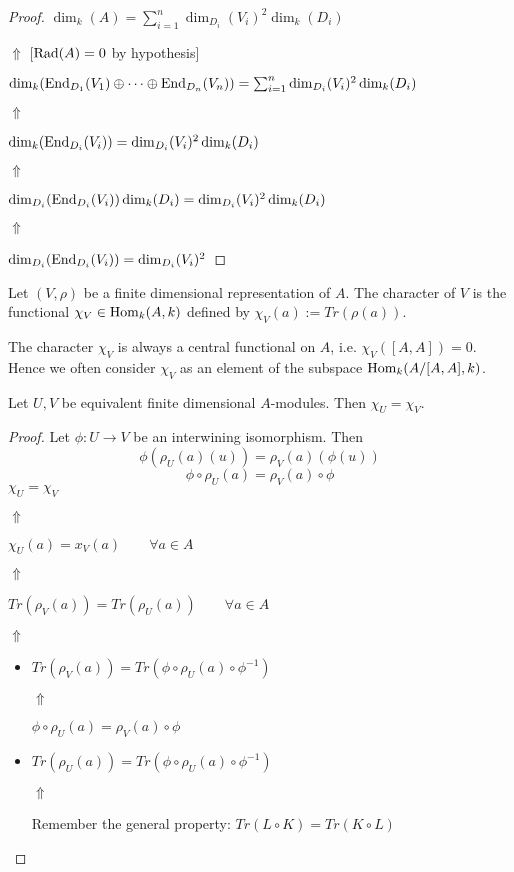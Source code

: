 \begin{proof}
\(\dim_{k}(A)=\sum _{i=1}^n \dim_{D_{i}}(V_{i})^{2} \dim_{k}(D_{i})\)

\(\Uparrow \) [\(\operatorname{Rad}(A)=0\) by hypothesis]

\(\dim_{k}(\operatorname{End}_{D_{1}}(V_{1})\oplus \cdots \oplus \operatorname{End}_{D_{n}}(V_{n}))=\sum _{i=1}^n \dim_{D_{i}}(V_{i})^{2} \dim_{k}(D_{i})\)

\(\Uparrow \)

\(\dim_{k}(\operatorname{End}_{D_{i}}(V_{i}))= \dim_{D_{i}}(V_{i})^{2} \dim_{k}(D_{i})\)

\(\Uparrow \)

\(\dim_{D_{i}}(\operatorname{End}_{D_{i}}(V_{i}))\dim_{k}(D_{i}) =\dim_{D_{i}}(V_{i})^{2} \dim_{k}(D_{i})\)

\(\Uparrow \)

\(\dim_{D_{i}}(\operatorname{End}_{D_{i}}(V_{i})) =\dim_{D_{i}}(V_{i})^{2} \)

\end{proof}

\begin{defn}
Let \((V,\rho )\) be a finite dimensional representation of \(A\). The character of \(V\) is the functional \(\chi _V\in \operatorname{Hom}_{k}(A,k)\) defined by \(\chi _V(a):=Tr(\rho (a)).\)
\end{defn}

\begin{prop}
The character \(\chi _V\) is always a central functional on \(A\), i.e. \(\chi _V([A,A])=0.\) Hence we often consider \(\chi _V\) as an element of the subspace \(\operatorname{Hom}_{k}(A/[A,A],k)\).
\end{prop}

\begin{prop}
Let \(U,V\) be equivalent finite dimensional \(A\)-modules. Then \(\chi _U=\chi _V.\)
\end{prop}
\newpage
\begin{proof}
Let \(\phi :U\rightarrow V\) be an interwining isomorphism. Then
\[
\phi (\rho _U(a)(u))=\rho _V(a)(\phi (u)) 
\] \[
\phi \circ \rho _U(a)=\rho _V(a)\circ \phi 
\]
\(\chi _U=\chi _V\)

\(\Uparrow \)

\(\chi _U(a)=x_V(a) \qquad \forall a\in A\)

\(\Uparrow \)

\(Tr(\rho _V(a))=Tr(\rho _U(a)) \qquad \forall a\in A\)

\(\Uparrow \)

\begin{itemize}
  \item \(Tr(\rho _V(a))=Tr(\phi \circ \rho _U(a)\circ \phi ^{-1})\)

\(\Uparrow \)

\(\phi \circ \rho _U(a)=\rho _V(a)\circ \phi \)
  \item \(Tr(\rho _U(a))=Tr(\phi \circ \rho _U(a)\circ \phi ^{-1})\)

\(\Uparrow \)

Remember the general property: \(Tr(L\circ K)=Tr(K\circ L)\)
\end{itemize}

\end{proof}

